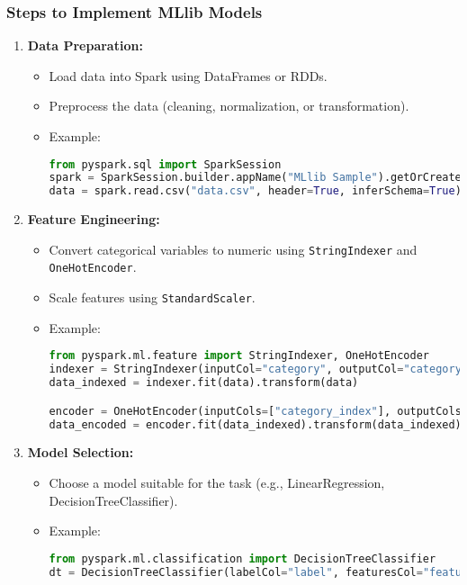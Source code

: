 \documentclass[aspectratio=169]{beamer}
\begin{document}
\begin{frame}[fragile]
    \frametitle{Steps to Implement MLlib Models}
    \begin{enumerate}
        \item \textbf{Data Preparation:}
        \begin{itemize}
            \item Load data into Spark using DataFrames or RDDs.
            \item Preprocess the data (cleaning, normalization, or transformation).
            \item Example:
            \begin{lstlisting}[language=python]
from pyspark.sql import SparkSession
spark = SparkSession.builder.appName("MLlib Sample").getOrCreate()
data = spark.read.csv("data.csv", header=True, inferSchema=True)
            \end{lstlisting}
        \end{itemize}

        \item \textbf{Feature Engineering:}
        \begin{itemize}
            \item Convert categorical variables to numeric using \texttt{StringIndexer} and \texttt{OneHotEncoder}.
            \item Scale features using \texttt{StandardScaler}.
            \item Example:
            \begin{lstlisting}[language=python]
from pyspark.ml.feature import StringIndexer, OneHotEncoder
indexer = StringIndexer(inputCol="category", outputCol="category_index")
data_indexed = indexer.fit(data).transform(data)

encoder = OneHotEncoder(inputCols=["category_index"], outputCols=["category_vec"])
data_encoded = encoder.fit(data_indexed).transform(data_indexed)
            \end{lstlisting}
        \end{itemize}

        \item \textbf{Model Selection:}
        \begin{itemize}
            \item Choose a model suitable for the task (e.g., LinearRegression, DecisionTreeClassifier).
            \item Example:
            \begin{lstlisting}[language=python]
from pyspark.ml.classification import DecisionTreeClassifier
dt = DecisionTreeClassifier(labelCol="label", featuresCol="features")
            \end{lstlisting}
        \end{itemize}
    \end{enumerate}
\end{frame}
\end{document}
